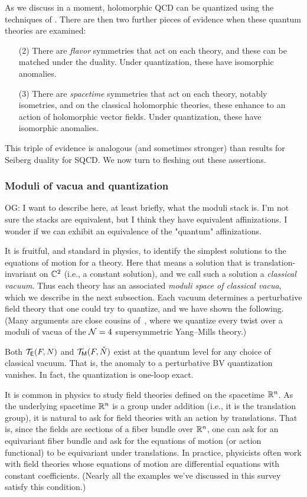 \documentclass[11pt]{amsart}
\def\owen#1{{\textcolor{violet!65!black}{OG: {#1}}}}
\begin{document}
As we discuss in a moment, holomorphic QCD can be quantized using the techniques of \cite{BW work}.
There are then two further pieces of evidence when these quantum theories are examined:
\begin{enumerate}
\item[(2)] There are {\em flavor} symmetries that act on each theory, and these can be matched under the duality. Under quantization, these have isomorphic anomalies.
\item[(3)] There are {\em spacetime} symmetries that act on each theory, notably isometries, and on the classical holomorphic theories, these enhance to an action of holomorphic vector fields. Under quantization, these have isomorphic anomalies.
\end{enumerate}
This triple of evidence is analogous (and sometimes stronger) than results for Seiberg duality for SQCD. 
We now turn to fleshing out these assertions.

\subsubsection{Moduli of vacua and quantization}

\owen{I want to describe here, at least briefly, what the moduli stack is. I'm not sure the stacks are equivalent, but I think they have equivalent affinizations. I wonder if we can exhibit an equivalence of the "quantum" affinizations.}

It is fruitful, and standard in physics, to identify the simplest solutions to the equations of motion for a theory.
Here that means a solution that is translation-invariant on $\mathbb C^2$ (i.e., a constant solution),
and we call such a solution a {\em classical vacuum}.
Thus each theory has an associated {\em moduli space of classical vacua},
which we describe in the next subsection.
Each vacuum determines a perturbative field theory that one could try to quantize,
and we have shown the following.
(Many arguments are close cousins of~\cite{EGW}, where we quantize every twist over a moduli of vacua of the $\mathcal N=4$ supersymmetric Yang--Mills theory.)

\begin{thm}
Both $\mathcal T_{\mathsf E}(F,N)$ and $\mathcal T_{{\sf M}}(F, \check{N})$ exist at the quantum level for any choice of classical vacuum. 
That is, the anomaly to a perturbative BV quantization vanishes.
In fact, the quantization is one-loop exact. 
\end{thm}

It is common in physics to study field theories defined on the spacetime $\mathbb R^n$.
As the underlying spacetime $\mathbb R^n$ is a group under addition (i.e., it is the translation group),
it is natural to ask for field theories with an action by translations.
That is, since the fields are sections of a fiber bundle over $\mathbb R^n$,
one can ask for an equivariant fiber bundle and ask for the equations of motion (or action functional) to be equivariant under translations.
In practice, physicists often work with field theories whose equations of motion are differential equations with constant coefficients.
(Nearly all the examples we've discussed in this survey satisfy this condition.)
\end{document}
